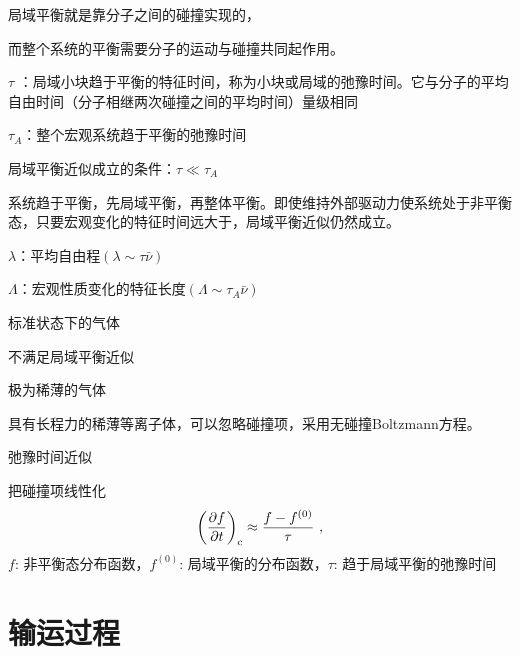 \documentclass[12pt,a4paper]{article}
\begin{document}
局域平衡就是靠分子之间的碰撞实现的，

而整个系统的平衡需要分子的运动与碰撞共同起作用。

$\tau$ ：局域小块趋于平衡的特征时间，称为小块或局域的弛豫时间。它与分子的平均自由时间（分子相继两次碰撞之间的平均时间）量级相同

$\tau_A$：整个宏观系统趋于平衡的弛豫时间

局域平衡近似成立的条件：$\tau \ll \tau_A$

系统趋于平衡，先局域平衡，再整体平衡。即使维持外部驱动力使系统处于非平衡态，只要宏观变化的特征时间远大于，局域平衡近似仍然成立。

$\lambda$：平均自由程$(\lambda \sim \tau \bar{\nu})$

$\Lambda$：宏观性质变化的特征长度$(\Lambda \sim \tau_A \bar{\nu})$

标准状态下的气体

不满足局域平衡近似

极为稀薄的气体

具有长程力的稀薄等离子体，可以忽略碰撞项，采用无碰撞Boltzmann方程。

弛豫时间近似

把碰撞项线性化
\begin{equation}
\left(\frac{\partial f}{\partial t} \right)_{\rm c}  \approx \frac{f-f^{(0)}}{\tau} ~,
\end{equation}
$f$: 非平衡态分布函数，$f^{(0)}$: 局域平衡的分布函数，$\tau$: 趋于局域平衡的弛豫时间


\section{输运过程}

























\end{document}
